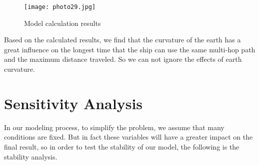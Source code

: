 \documentclass{mcmthesis}
\begin{document}
\begin{figure}[h]
\small
\centering
\texttt{[image: photo29.jpg]}
\caption{Model calculation results} \label{fig:aa}
\end{figure}

Based on the calculated results, we find that the curvature of the earth has a great influence on the longest time that the ship can use the same multi-hop path and the maximum distance traveled. So we can not ignore the effects of earth curvature.





\section{Sensitivity Analysis }
In our modeling process, to simplify the problem, we assume that many conditions are fixed. But in fact these variables will have a greater impact on the final result, so in order to test the stability of our model, the following is the stability analysis.
\end{document}
